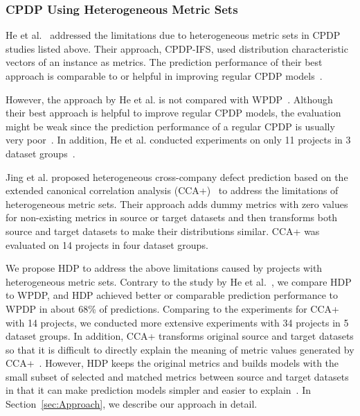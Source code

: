 \subsubsection{CPDP Using Heterogeneous Metric Sets}
He et al.~\cite{He14} addressed the limitations due to
heterogeneous metric sets in CPDP studies listed
above.
Their approach, CPDP-IFS, used distribution
characteristic vectors of an instance as metrics.
The prediction performance of their best approach is comparable to or
helpful in improving regular CPDP models~\cite{He14}.

However, the approach by He et al. is not compared with WPDP~\cite{He14}.
Although their best approach is helpful to improve regular CPDP models, the
evaluation might be weak since the prediction performance of a regular CPDP is
usually very poor~\cite{Zimmermann09}. In addition, He et al. conducted
experiments on only 11 projects in 3 dataset groups~\cite{He14}.

Jing et al. proposed heterogeneous cross-company defect prediction based on the extended canonical correlation analysis (CCA+)~\cite{Jing15} to address the limitations of heterogeneous metric sets. Their approach adds dummy metrics with zero values for non-existing metrics in source or target datasets and then transforms both source and target datasets to make their distributions similar. CCA+ was evaluated on 14 projects in four dataset groups.

We propose HDP to address the above
limitations caused by projects with heterogeneous metric sets.
Contrary to the study by He et al.~\cite{He14}, we compare HDP to
WPDP, and HDP achieved better or comparable prediction performance to WPDP in
about 68\% of predictions.
Comparing to the experiments for CCA+~\cite{Jing15} with 14 projects, we conducted more extensive experiments with 34 projects in 5 dataset groups. In addition, CCA+ transforms original source and target datasets so that it is difficult to directly explain the meaning of metric values generated by CCA+~\cite{Jing15}. However, HDP keeps the original metrics and builds models with the small subset of selected and matched metrics between source and target datasets in that it can make prediction models simpler and easier to explain~\cite{Nam15HDP,Shihab14}. In
Section~\ref{sec:Approach}, we describe our approach in detail.

